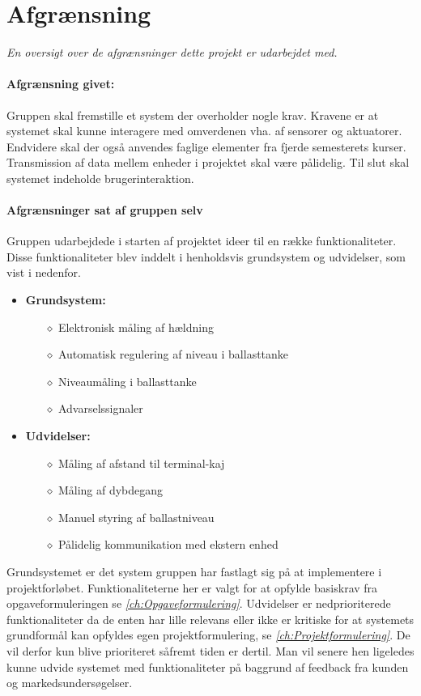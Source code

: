 \chapter{Afgrænsning}
\label{ch:afgraensning}
\textit{En oversigt over de afgrænsninger dette projekt er udarbejdet med.}
\subsubsection{Afgrænsning givet:}
Gruppen skal fremstille et system der overholder nogle krav. Kravene er at systemet skal kunne interagere med omverdenen vha. af sensorer og aktuatorer. Endvidere skal der også anvendes faglige elementer fra fjerde semesterets kurser. Transmission af data mellem enheder i projektet skal være pålidelig. Til slut skal systemet indeholde brugerinteraktion. 
\subsubsection{Afgrænsninger sat af gruppen selv}
Gruppen udarbejdede i starten af projektet ideer til en række funktionaliteter. Disse funktionaliteter blev inddelt i henholdsvis grundsystem og udvidelser, som vist i nedenfor.
\begin{itemize}
\item \textbf{Grundsystem:}
\begin{itemize}
\item[$\diamond$] Elektronisk måling af hældning
\item[$\diamond$] Automatisk regulering af niveau i ballasttanke
\item[$\diamond$] Niveaumåling i ballasttanke
\item[$\diamond$] Advarselssignaler
\end{itemize}
\item \textbf{Udvidelser:}
\begin{itemize}
\item[$\diamond$] Måling af afstand til terminal-kaj
\item[$\diamond$] Måling af dybdegang
\item[$\diamond$] Manuel styring af ballastniveau
\item[$\diamond$] Pålidelig kommunikation med ekstern enhed
\end{itemize}
\end{itemize}
Grundsystemet er det system gruppen har fastlagt sig på at implementere i projektforløbet. Funktionaliteterne her er valgt for at opfylde basiskrav fra opgaveformuleringen se \textit{\ref{ch:Opgaveformulering}}.
Udvidelser er nedprioriterede funktionaliteter da de enten har lille relevans eller ikke er kritiske for at systemets grundformål kan opfyldes egen projektformulering, se \textit{\ref{ch:Projektformulering}}. De vil derfor kun blive prioriteret såfremt tiden er dertil. 
Man vil senere hen ligeledes kunne udvide systemet med funktionaliteter på baggrund af feedback fra kunden og markedsundersøgelser.


